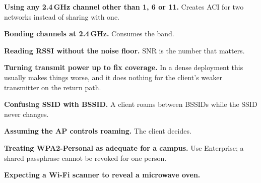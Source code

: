 \begin{pitfall}
\begin{tight}
  \item \textbf{Using any 2.4\,GHz channel other than 1, 6 or 11.} Creates ACI
        for two networks instead of sharing with one.
  \item \textbf{Bonding channels at 2.4\,GHz.} Consumes the band.
  \item \textbf{Reading RSSI without the noise floor.} SNR is the number that
        matters.
  \item \textbf{Turning transmit power up to fix coverage.} In a dense
        deployment this usually makes things worse, and it does nothing for the
        client's weaker transmitter on the return path.
  \item \textbf{Confusing SSID with BSSID.} A client roams between BSSIDs while
        the SSID never changes.
  \item \textbf{Assuming the AP controls roaming.} The client decides.
  \item \textbf{Treating WPA2-Personal as adequate for a campus.} Use Enterprise;
        a shared passphrase cannot be revoked for one person.
  \item \textbf{Expecting a Wi-Fi scanner to reveal a microwave oven.}
\end{tight}
\end{pitfall}


